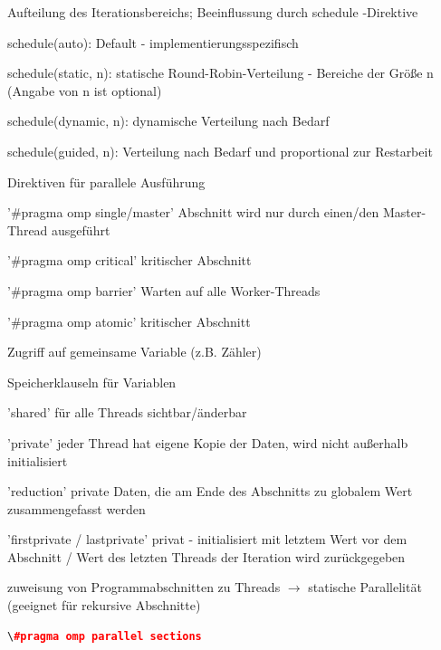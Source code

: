 \documentclass[10pt]{article}
\begin{document}
\begin{itemize*}
\begin{itemize*}
    \end{itemize*}
    \item Aufteilung des Iterationsbereichs; Beeinflussung durch schedule -Direktive
    \begin{itemize*}
      \item schedule(auto): Default - implementierungsspezifisch
      \item schedule(static, n): statische Round-Robin-Verteilung - Bereiche der Größe n (Angabe von n ist optional)
      \item schedule(dynamic, n): dynamische Verteilung nach Bedarf
      \item schedule(guided, n): Verteilung nach Bedarf und proportional zur Restarbeit
    \end{itemize*}
    \item Direktiven für parallele Ausführung
    \begin{itemize*}
      \item '\#pragma omp single/master' Abschnitt wird nur durch einen/den Master-Thread ausgeführt
      \item '\#pragma omp critical' kritischer Abschnitt
      \item '\#pragma omp barrier' Warten auf alle Worker-Threads
      \item '\#pragma omp atomic' kritischer Abschnitt \item Zugriff auf gemeinsame Variable (z.B. Zähler)
    \end{itemize*}
    \item Speicherklauseln für Variablen
    \begin{itemize*}
      \item 'shared' für alle Threads sichtbar/änderbar
      \item 'private' jeder Thread hat eigene Kopie der Daten, wird nicht außerhalb initialisiert
      \item 'reduction' private Daten, die am Ende des Abschnitts zu globalem Wert zusammengefasst werden
      \item 'firstprivate / lastprivate' privat - initialisiert mit letztem Wert vor dem Abschnitt / Wert des letzten Threads der Iteration wird zurückgegeben
    \end{itemize*}
    \item zuweisung von Programmabschnitten zu Threads $\rightarrow$ statische Parallelität (geeignet für rekursive Abschnitte)
    \begin{lstlisting}[language=C++]
        \#pragma omp parallel sections

\end{lstlisting}
\end{itemize*}
\end{document}
